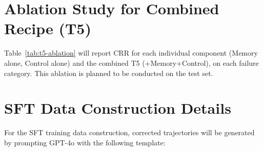 \section{Ablation Study for Combined Recipe (T5)}
\label{app:ablation}

Table~\ref{tab:t5-ablation} will report CRR for each individual component (Memory alone, Control alone) and the combined T5 (+Memory+Control), on each failure category. This ablation is planned to be conducted on the test set.

\begin{table}[h]
\centering
\caption{Ablation of T5 (+Memory+Control) against individual components. CRR will be reported for each failure category upon completion of the evaluation. [Placeholder --- to be filled]}
\label{tab:t5-ablation}
\end{table}

\section{SFT Data Construction Details}
\label{app:sft-data}

For the SFT training data construction, corrected trajectories will be generated by prompting GPT-4o with the following template:

\medskip
{}
\medskip

